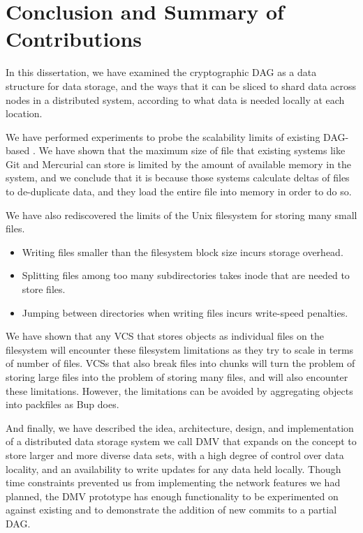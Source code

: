 \chapter{Conclusion and Summary of Contributions}


In this dissertation, we have examined the cryptographic \acrfull{DAG} as a data
structure for data storage, and the ways that it can be sliced to shard data
across nodes in a distributed system, according to what data is needed locally
at each location.

We have performed experiments to probe the scalability limits of existing
\gls{DAG}-based . We have shown that the maximum size of file
that existing systems like Git and Mercurial can store is limited by the amount
of available memory in the system, and we conclude that it is because those
systems calculate deltas of files to de-duplicate data, and they load the entire
file into memory in order to do so.

We have also rediscovered the limits of the Unix filesystem for storing many
small files.

\begin{itemize}

    \item Writing files smaller than the filesystem block size incurs storage
        overhead.

    \item Splitting files among too many subdirectories takes \gls{inode} that
        are needed to store files.

    \item Jumping between directories when writing files incurs write-speed
        penalties.

\end{itemize}

We have shown that any \gls{VCS} that stores objects as individual files on the
filesystem will encounter these filesystem limitations as they try to scale in
terms of number of files. \glspl{VCS} that also break files into chunks will
turn the problem of storing large files into the problem of storing many files,
and will also encounter these limitations. However, the limitations can be
avoided by aggregating objects into \glspl{packfile} as Bup does.

And finally, we have described the idea, architecture, design, and
implementation of a distributed data storage system we call \gls{DMV} that
expands on the  concept to store
larger and more diverse data sets, with a high degree of control over data
locality, and an availability to write updates for any data held locally. Though
time constraints prevented us from implementing the network features we had
planned, the \gls{DMV} prototype has enough functionality to be experimented on
against existing  and to demonstrate the addition of new
\glspl{commit} to a partial \gls{DAG}.
